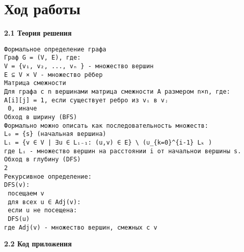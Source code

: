 \documentclass{article}
\begin{document}
	
	\section{Ход работы}
    \label{sec:exp:code}
 \textbf{2.1 Теория решения}
	\begin{verbatim}
Формальное определение графа
Граф G = (V, E), где:
V = {v₁, v₂, ..., vₙ } - множество вершин
E ⊆ V × V - множество рёбер
Матрица смежности
Для графа с n вершинами матрица смежности A размером n×n, где:
A[i][j] = 1, если существует ребро из vᵢ в vⱼ
 0, иначе
Обход в ширину (BFS)
Формально можно описать как последовательность множеств:
L₀ = {s} (начальная вершина)
Lᵢ = {v ∈ V | ∃u ∈ Lᵢ₋₁: (u,v) ∈ E} \ (∪_{k=0}^{i-1} Lₖ )
где Lᵢ - множество вершин на расстоянии i от начальнои вершины s.
Обход в глубину (DFS)
2
Рекурсивное определение:
DFS(v):
 посещаем v
 для всех u ∈ Adj(v):
 если u не посещена:
 DFS(u)
где Adj(v) - множество вершин, смежных с v
\end{verbatim}
	\label{sec:exp:code}
    \textbf{2.2 Код приложения}
\end{document}
